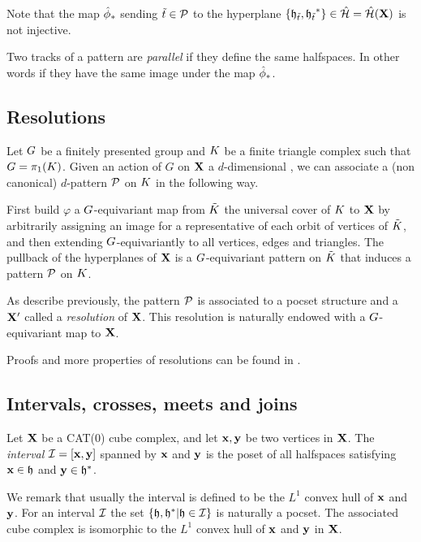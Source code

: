 Note that the map $\hat{\phi}_*$ sending ${\tilde{t}}\in{\mathcal{P}}$ to the hyperplane $\{\mathfrak{h}_{{\tilde{t}}},{\mathfrak{h}_{{\tilde{t}}}}^*\} \in \hat{\mathcal{H}}=\hat{\mathcal{H}}(\mathbf{X})$ is not injective. 

\begin{definition}[parallelism]
	Two tracks of a pattern are \emph{parallel} if they define the same halfspaces. In other words if they have the same image under the map $\hat{\phi}_*$.
\end{definition}

\subsection{Resolutions} \label{resolutions}
Let $G$ be a finitely presented group and  $K$ be a finite triangle complex such that $G = \pi_1(K)$.
Given an action of $G$ on $\mathbf{X}$ a $d$-dimensional \CCC, we can associate a (non canonical) $d$-pattern ${\mathcal{P}}$ on $K$ in the following way.

First build $\varphi$ a $G$-equivariant map from $\tilde{K}$ the universal cover of $K$ to $\mathbf{X}$ by arbitrarily assigning an image for a representative of each orbit of vertices of $\tilde{K}$, and then extending $G$-equivariantly to all vertices, edges and triangles. 
The pullback of the hyperplanes of $\mathbf{X}$ is a $G$-equivariant pattern on $\tilde{K}$ that induces a pattern ${\mathcal{P}}$ on $K$.

As describe previously, the pattern ${\mathcal{P}}$ is associated to a pocset structure and a \CCC $\mathbf{X}'$ called a \emph{resolution} of $\mathbf{X}$. This resolution is naturally endowed with a $G$-equivariant map to $\mathbf{X}$.

 Proofs and more properties of resolutions can be found in \cite{BeLa16,BeLa16b}.

\subsection{Intervals, crosses, meets and joins}


	Let $\mathbf{X}$ be a CAT(0) cube complex, and let $\mathbf{x},\mathbf{y}$ be two vertices in $\mathbf{X}$. The \emph{interval}  $\mathcal{I}=[\mathbf{x},\mathbf{y}]$ spanned by $\mathbf{x}$ and $\mathbf{y}$ is the poset of all halfspaces satisfying $\mathbf{x}\in\mathfrak{h}$ and $\mathbf{y}\in{\mathfrak{h}}^*$.


\begin{remark}
	We remark that usually the interval is defined to be the $L^1$ convex hull of $\mathbf{x}$ and $\mathbf{y}$.
	For an interval $\mathcal{I}$ the set $\{\mathfrak{h},{\mathfrak{h}}^* | \mathfrak{h}\in\mathcal{I}\}$ is naturally a pocset.
	The associated cube complex is isomorphic to the $L^1$ convex hull of $\mathbf{x}$ and $\mathbf{y}$ in $\mathbf{X}$.
\end{remark}


